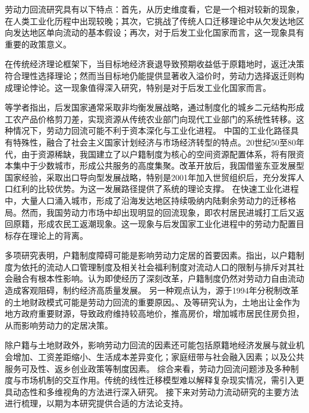 \documentclass[
  a4paper,
  zihao=-4,
  fontset=mac,
  AutoFakeBold,
  AutoFakeSlant,
  oneside]{ctexbook}
\begin{document}
劳动力回流研究具有以下特点：首先，从历史维度看，它是一个相对较新的现象，在人类工业化历程中出现较晚；其次，它挑战了传统人口迁移理论中从欠发达地区向发达地区单向流动的基本假设；再次，对于后发工业化国家而言，这一现象具有重要的政策意义。

在传统经济理论框架下，当目标地经济衰退导致预期收益低于原籍地时，返迁决策符合理性选择理论；然而当目标地仍能提供显著收入溢价时，劳动力选择返迁则构成理论悖论。这一现象值得深入研究，特别是对于后发工业化国家而言。

\textcite{CaiFangHuJiZhiDuYuLaoDongLiShiChangBaoHu2001}等学者指出，后发国家通常采取非均衡发展战略，通过制度化的城乡二元结构形成工农产品价格剪刀差，实现资源从传统农业部门向现代工业部门的系统性转移。这种情况下，劳动力回流可能不利于资本深化与工业化进程。
中国的工业化路径具有特殊性，融合了社会主义国家计划经济与市场经济转型的特点。20世纪50至80年代，由于资源稀缺，我国建立了以户籍制度为核心的空间资源配置体系，将有限资本集中于少数城市，形成公共服务的高度集聚。改革开放后，我国借鉴东亚发展型国家经验，采取出口导向型发展战略，特别是2001年加入世贸组织后，充分发挥人口红利的比较优势。\textcite{LinYiFuZhongGuoDeJingJiFaZhanZhanLueYuDiQuShouRuChaiJu2003}为这一发展路径提供了系统的理论支撑。
在快速工业化进程中，大量人口涌入城市，形成了沿海发达地区持续吸纳内陆剩余劳动力的迁移格局。然而，我国劳动力市场中却出现明显的回流现象，即农村居民进城打工后又返回原籍，形成农民工返潮现象。这一现象与后发国家工业化进程中的劳动力配置目标存在理论上的背离。

多项研究表明，户籍制度障碍可能是影响劳动力定居的首要因素。\textcite{RenYuanChengShiLiuDongRenKouDeSheHuiRongHeWenXianShuPing2006}指出，以户籍制度为依托的流动人口管理制度及相关社会福利制度对流动人口的限制与排斥对其社会融合有根本性影响。\textcite{LuYiLongHuKouHuanQiZuoYongMaHuJiZhiDuYuSheHuiFenCengHeLiuDong2008}认为即使经历了深刻改革，户籍制度仍然对劳动力自由流动造成客观阻碍，制约经济高质量发展。
另一种观点认为，源于1994年分税制改革的土地财政模式可能是劳动力回流的重要原因。\textcite{ChenYingFangNongMinGongZhiDuAnPaiYuShenFenRenTong2005}、\textcite{niehuihuaZhongguogaofangjiadexinzhengzhijingjixuejieshiYiZhengqihemou2013}及\textcite{YuJianXingDiFangFaZhanXingZhengFuDeXingWeiLuoJiJiZhiDuJiChu2012}等研究认为，土地出让金作为地方政府重要财源，导致政府维持较高地价，推高房价，增加城市居民住房负担，从而影响劳动力的定居决策。

除户籍与土地财政外，影响劳动力回流的因素还可能包括原籍地经济发展与就业机会增加、工资差距缩小、生活成本差异变化；家庭纽带与社会融入因素；以及公共服务可及性、返乡创业政策等制度因素。
综合来看，劳动力回流问题涉及多种制度与市场机制的交互作用。传统的线性迁移模型难以解释复杂现实情况，需引入更具动态性和多维视角的方法进行深入研究。
接下来对劳动力流动研究的主要方法进行梳理，以期为本研究提供合适的方法论支持。
\end{document}
